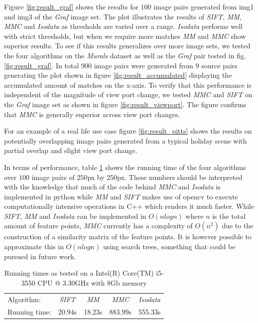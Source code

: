 \documentclass[12pt,journal]{IEEEtran}
\begin{document}
Figure \ref{fig:result_graf} shows the results for 100 image pairs 
generated from img1 and img3 of the \emph{Graf} image set. The plot 
illustrates the results of \emph{SIFT}, \emph{MM}, \emph{MMC} and 
\emph{Isodata} as thresholds are varied over a range. \emph{Isodata} 
performs well with strict thresholds, but when we require more matches 
\emph{MM} and \emph{MMC} show superior results. To see if this results 
generalizes over more image sets, we tested the four algorithms on the 
\emph{Murals} dataset as well as the \emph{Graf} pair tested in fig.  
\ref{fig:result_graf}. In total 900 image pairs were generated from 9 
source pairs generating the plot shown in figure 
\ref{fig:result_accumulated} displaying the accumulated amount of 
matches on the x-axis. To verify that this performance is independent of 
the magnitude of view port change, we tested \emph{MMC} and \emph{SIFT} 
on the \emph{Graf} image set as shown in figure 
\ref{fig:result_viewport}. The figure confirms that \emph{MMC} is 
generally superior across view port changes.

For an example of a real life use case figure \ref{fig:result_pitts} 
shows the results on potentially overlapping image pairs generated from 
a typical holiday scene with partial overlap and slight view port 
change.

In terms of performance, table \ref{table:running_times} shows the 
running time of the four algorithms over $100$ image pairs of $250$px by 
$250$px. These numbers should be interpreted with the knowledge that 
much of the code behind \emph{MMC} and \emph{Isodata} is implemented in 
python while \emph{MM} and \emph{SIFT} makes use of opencv to execute 
computationally intensive operations in C++ which renders it much 
faster. While \emph{SIFT}, \emph{MM} and \emph{Isodata} can be 
implemented in $O(nlogn)$ where $n$ is the total amount of feature 
points, \emph{MMC} currently has a complexity of $O(n^2)$ due to the 
construction of a similarity matrix of the feature points. It is however 
possible to approximate this in $O(nlogn)$ using search trees, something 
that could be pursued in future work.
%
\begin{savenotes}
\begin{table}
	\centering
	\small
\begin{tabular}{l*{4}{c}}
	Algorithm: & \emph{SIFT} & \emph{MM} & \emph{MMC} & \emph{Isodata} 
	\\
	\noalign{\smallskip} 
	Running time: & 20.94s & 18.23s & 883.99s & 555.33s \\
\end{tabular}
\caption{Running times as tested on a Intel(R) Core(TM) i5-3550 CPU @ 
3.30GHz with 8Gb memory}
\label{table:running_times}
\end{table}
\end{savenotes}
%
\end{document}
